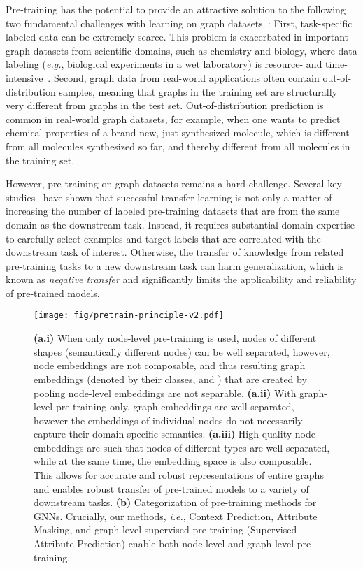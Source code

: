 \documentclass{article} \usepackage{iclr2020_conference,times}
\numberwithin{equation}{section}
\theoremstyle{plain}
\theoremstyle{definition}
\theoremstyle{remark}
\newcommand{\ie}{\textit{i.e.}}
\newcommand{\eg}{\textit{e.g.}}
\begin{document}
Pre-training has the potential to provide an attractive solution to the following two fundamental challenges with learning on graph datasets~\citep{pan2009survey,hendrycks2019using}: First, task-specific labeled data can be extremely scarce. This problem is exacerbated in important graph datasets from scientific domains, such as chemistry and biology, where data labeling (\eg, biological experiments in a wet laboratory) is resource- and time-intensive~\citep{zitnik2018prioritizing}. Second, graph data from real-world applications often contain out-of-distribution samples, meaning that graphs in the training set are structurally very different from graphs in the test set. Out-of-distribution prediction is common in real-world graph datasets, for example, when one wants to predict chemical properties of a brand-new, just synthesized molecule, which is different from all molecules synthesized so far, and thereby different from all molecules in the training set. 

However, pre-training on graph datasets remains a hard challenge.
Several key studies~\citep{xu2017demystifying, ching2018opportunities,wang2019data} have shown that successful transfer learning is not only a matter of increasing the number of labeled pre-training datasets that are from the same domain as the downstream task. Instead, it requires substantial domain expertise to carefully select examples and target labels that are correlated with the downstream task of interest. Otherwise, the transfer of knowledge from related pre-training tasks to a new downstream task can harm generalization, which is known as \emph{negative transfer} \citep{rosenstein2005transfer} and significantly limits the
applicability and reliability of pre-trained models.

\begin{figure}[t]
\centering
\texttt{[image: fig/pretrain-principle-v2.pdf]}
\caption{
{\bf (a.i)} When only node-level pre-training is used, nodes of different shapes (semantically different nodes) can be well separated, however, node embeddings are not composable, and thus resulting graph embeddings (denoted by their classes,  and ) that are created by pooling node-level embeddings are not separable. 
{\bf (a.ii)} With graph-level pre-training only, graph embeddings are well separated, however the embeddings of individual nodes do not necessarily capture their domain-specific semantics.
{\bf (a.iii)} High-quality node embeddings are such that nodes of different types are well separated, while at the same time, the embedding space is also composable. This allows for accurate and robust representations of entire graphs and enables robust transfer of pre-trained models to a variety of downstream tasks. 
{\bf (b)} Categorization of pre-training methods for GNNs. Crucially, our methods, \ie, Context Prediction, Attribute Masking, and graph-level supervised pre-training (Supervised Attribute Prediction) enable both node-level and graph-level pre-training. 
\vspace{-5mm}
}
\label{fig:principle}
\end{figure}
\end{document}

